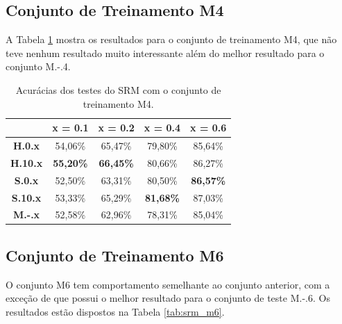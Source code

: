 \subsection{Conjunto de Treinamento M4}

A Tabela \ref{tab:srm_m4} mostra os resultados para o conjunto de treinamento M4, que não teve nenhum resultado muito interessante além do melhor resultado para o conjunto M.-.4.

\begin{table}[!htb]
\centering
\begin{tabular}{c|c|c|c|c|}
\cline{2-5}
\textbf{}                             & \textbf{x = 0.1} & \textbf{x = 0.2} & \textbf{x = 0.4} & \textbf{x = 0.6} \\ \hline
\multicolumn{1}{|c|}{\textbf{H.0.x}}  & 54,06\%          & 65,47\%          & 79,80\%          & 85,64\%          \\ \hline
\multicolumn{1}{|c|}{\textbf{H.10.x}} & \textbf{55,20\%} & \textbf{66,45\%} & 80,66\% & 86,27\% \\ \hline
\multicolumn{1}{|c|}{\textbf{S.0.x}}  & 52,50\%          & 63,31\%          & 80,50\%          & \textbf{86,57\%}          \\ \hline
\multicolumn{1}{|c|}{\textbf{S.10.x}} & 53,33\%          & 65,29\%          & \textbf{81,68\%}          & 87,03\%          \\ \hline
\multicolumn{1}{|c|}{\textbf{M.-.x}}  & 52,58\%          & 62,96\%          & 78,31\%          & 85,04\%          \\ \hline
\end{tabular}
\caption{Acurácias dos testes do SRM com o conjunto de treinamento M4.}
\label{tab:srm_m4}

\end{table}


\subsection{Conjunto de Treinamento M6}

O conjunto M6 tem comportamento semelhante ao conjunto anterior, com a exceção de que possui o melhor resultado para o conjunto de teste M.-.6. Os resultados estão dispostos na Tabela \ref{tab:srm_m6}.

